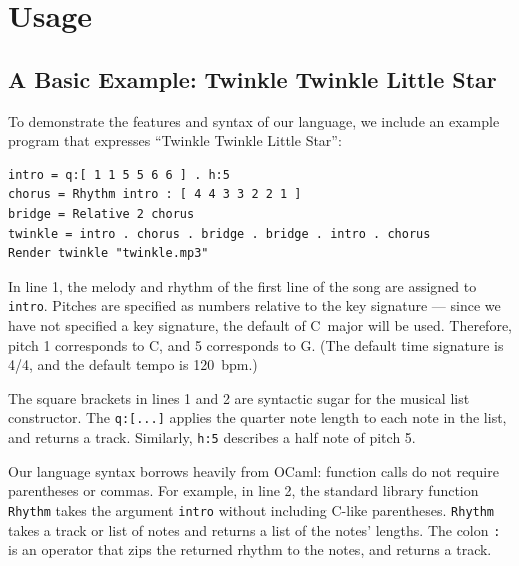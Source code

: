 \documentclass[11pt, onecolumn, letterpaper]{article}
\begin{document}

\section{Usage}

\subsection{A Basic Example: Twinkle Twinkle Little Star}
To demonstrate the features and syntax of our language, we include an example program that expresses ``Twinkle Twinkle Little Star'':

\begin{lstlisting}
intro = q:[ 1 1 5 5 6 6 ] . h:5
chorus = Rhythm intro : [ 4 4 3 3 2 2 1 ]
bridge = Relative 2 chorus
twinkle = intro . chorus . bridge . bridge . intro . chorus
Render twinkle "twinkle.mp3"
\end{lstlisting}

In line 1, the melody and rhythm of the first line of the song are assigned to \texttt{intro}. Pitches are specified as numbers relative to the key signature --- since we have not specified a key signature, the default of C~major will be used. Therefore, pitch 1 corresponds to C, and 5 corresponds to G. (The default time signature is 4/4, and the default tempo is 120~bpm.)

The square brackets in lines 1 and 2 are syntactic sugar for the musical list constructor. The \texttt{q:[...]} applies the quarter note length to each note in the list, and returns a track. Similarly, \texttt{h:5} describes a half note of pitch 5.

Our language syntax borrows heavily from OCaml: function calls do not require parentheses or commas. For example, in line 2, the standard library function \texttt{Rhythm} takes the argument \texttt{intro} without including C-like parentheses. \texttt{Rhythm} takes a track or list of notes and returns a list of the notes' lengths. The colon \texttt{:} is an operator that zips the returned rhythm to the notes, and returns a track.
\end{document}
